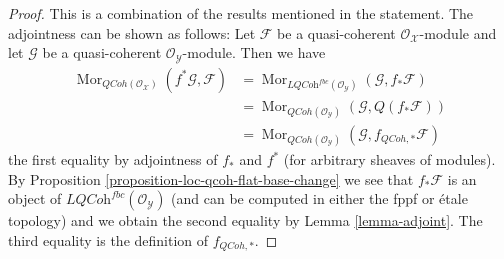 \documentclass{stacks-project}
\theoremstyle{plain}
\theoremstyle{definition}
\theoremstyle{remark}
\numberwithin{equation}{subsection}
\def\Mor{\mathop{\mathrm{Mor}}\nolimits}
\def\QCoh{\mathit{QCoh}}
\begin{document}
\begin{proof}
This is a combination of the results mentioned in the statement.
The adjointness can be shown as follows: Let $\mathcal{F}$
be a quasi-coherent $\mathcal{O}_\mathcal{X}$-module and let
$\mathcal{G}$ be a quasi-coherent $\mathcal{O}_\mathcal{Y}$-module.
Then we have
\begin{align*}
\Mor_{\QCoh(\mathcal{O}_\mathcal{X})}(f^*\mathcal{G}, \mathcal{F})
& =
\Mor_{\textit{LQCoh}^{fbc}(\mathcal{O}_\mathcal{Y})}
(\mathcal{G}, f_*\mathcal{F}) \\
& =
\Mor_{\QCoh(\mathcal{O}_\mathcal{Y})}(\mathcal{G}, Q(f_*\mathcal{F}))
\\
& =
\Mor_{\QCoh(\mathcal{O}_\mathcal{Y})}(\mathcal{G},
f_{\QCoh, *}\mathcal{F})
\end{align*}
the first equality by adjointness of $f_*$ and $f^*$ (for arbitrary sheaves
of modules). By
Proposition \ref{proposition-loc-qcoh-flat-base-change}
we see that $f_*\mathcal{F}$ is an object of
$\textit{LQCoh}^{fbc}(\mathcal{O}_\mathcal{Y})$
(and can be computed in either the fppf or \'etale topology) and we
obtain the second equality by Lemma \ref{lemma-adjoint}. The third
equality is the definition of $f_{\QCoh, *}$.


\end{proof}
\end{document}
